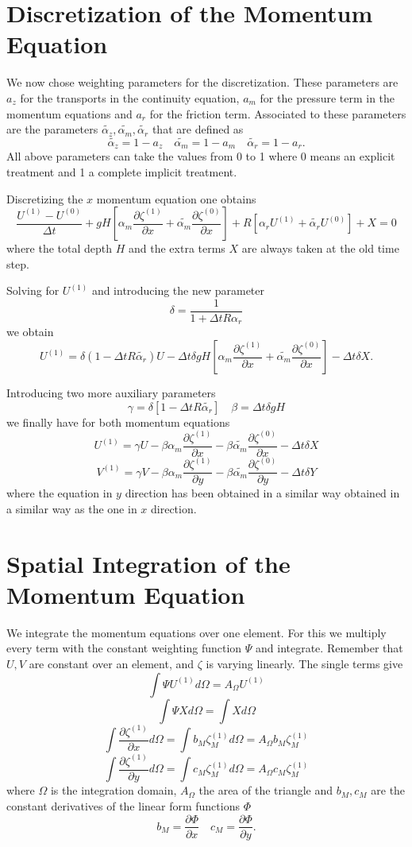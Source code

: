 \documentclass[12pt]{article}
\newcommand{\xdif}[1] {\frac{\partial #1}{\partial x}}
\newcommand{\ydif}[1] {\frac{\partial #1}{\partial y}}
\newcommand{\dt} {\Delta t}
\newcommand{\AO} {A_{\Omega}}
\newcommand{\dO} {d \Omega}
\newcommand{\beq} {\begin{equation}}
\newcommand{\eeq} {\end{equation}}
\newcommand{\Uold} {U^{(0)}}
\newcommand{\Unew} {U^{(1)}}
\newcommand{\Vnew} {V^{(1)}}
\newcommand{\zold} {\zeta^{(0)}}
\newcommand{\znew} {\zeta^{(1)}}
\newcommand{\az} {\alpha_{z}}
\newcommand{\am} {\alpha_{m}}
\newcommand{\ar} {\alpha_{r}}
\newcommand{\azt} {\tilde{\az}}
\newcommand{\amt} {\tilde{\am}}
\newcommand{\art} {\tilde{\ar}}
\begin{document}
\section*{Discretization of the Momentum Equation}


We now chose weighting parameters for the discretization. These parameters
are $a_z$ for the transports in the continuity equation, $a_m$
for the pressure term in the momentum equations and $a_r$ for
the friction term. Associated to these parameters are the parameters
$\azt, \amt, \art$ that are defined as
\beq
\azt = 1 - a_z \quad \amt = 1 - a_m \quad \art = 1 - a_r.
\eeq
All above parameters can take the values from 0 to 1 where
0 means an explicit treatment and 1 a complete implicit treatment.

Discretizing the $x$ momentum equation one obtains
\beq
\frac{\Unew-\Uold}{\dt} + gH [ \am \xdif{\znew} + \amt \xdif{\zold} ]
	+ R [ \ar \Unew + \art \Uold ] + X = 0
\eeq
where the total depth $H$ and the extra terms $X$ are always taken
at the old time step.

Solving for $\Unew$ and introducing the new parameter 
\beq
\delta = \frac{1}{1 + \dt R \ar}
\eeq
we obtain 
\beq
\Unew = \delta (1 - \dt R \art) U 
		- \dt \delta gH [ \am \xdif{\znew} + \amt \xdif{\zold} ]
		- \dt \delta X.
\eeq

Introducing two more auxiliary parameters
\beq
	\gamma = \delta [ 1 - \dt R \art ] \quad
	\beta = \dt \delta gH
\eeq
we finally have for both momentum equations
\beq
\Unew = \gamma U 
		- \beta \am \xdif{\znew} - \beta \amt \xdif{\zold} 
		- \dt \delta X
\eeq
\beq
\Vnew = \gamma V 
		- \beta \am \ydif{\znew} - \beta \amt \ydif{\zold} 
		- \dt \delta Y
\eeq
where the equation in $y$ direction
has been obtained in a similar way obtained in a similar way
as the one in $x$ direction.


\section*{Spatial Integration of the Momentum Equation}


We integrate the momentum equations over one element. For this
we multiply every term with the constant weighting function
$\Psi$ and integrate. Remember that $U,V$ are constant over an
element, and $\zeta$ is varying linearly. The single terms
give
\beq
\int \Psi \Unew \dO = \AO \Unew
\eeq
\beq
\int \Psi X \dO = \int X \dO
\eeq
\beq
\int \xdif{\znew} \dO = \int b_M \znew_M \dO = \AO b_M \znew_M
\eeq
\beq
\int \ydif{\znew} \dO = \int c_M \znew_M \dO = \AO c_M \znew_M
\eeq
where $\Omega$ is the integration domain, $\AO$ the area of the
triangle and $b_M, c_M$ are the constant derivatives of the 
linear form functions $\Phi$
\beq
b_M = \xdif{\Phi} \quad c_M = \ydif{\Phi}.
\eeq
\end{document}

